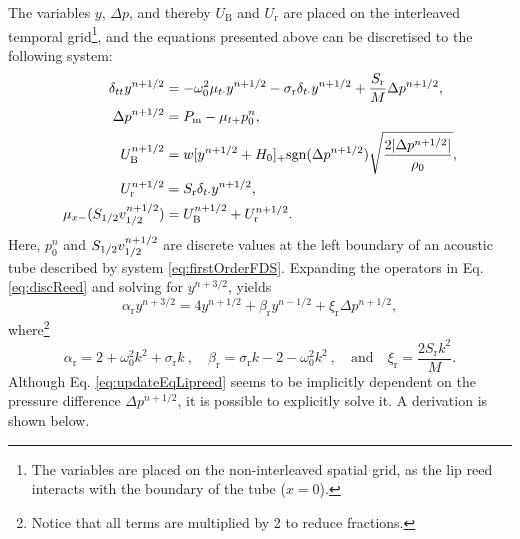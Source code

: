 The variables $y$, $\Delta p$, and thereby $U_\text{B}$ and $U_\text{r}$ are placed on the interleaved temporal grid\footnote{The variables are placed on the non-interleaved spatial grid, as the lip reed interacts with the boundary of the tube ($x=0$).}, and the equations presented above can be discretised to the following system:
\begin{subequations}\label{eq:discreteLipSystem}
    \begin{align}
        \delta_{tt}y^{n+1/2} &= -\omega_0^2\mu_{t\cdot}y^{n+1/2}-\sigma_\text{r}\delta_{t\cdot}y^{n+1/2} + \frac{S_\text{r}}{M}\Delta p^{n+1/2},\label{eq:discReed}\\
        \Delta p^{n+1/2} &= P_\text{m} - \mu_{t+}p_0^n,\label{eq:pDiff}\\
        U_\text{B}^{n+1/2} &= w[y^{n+1/2}+H_0]_+\text{sgn}(\Delta p^{n+1/2})\sqrt{\frac{2|\Delta p^{n+1/2}|}{\rho_0}},\label{eq:bernoulli}\\
        U_\text{r}^{n+1/2} &= S_\text{r}\delta_{t\cdot}y^{n+1/2},\label{eq:Ur}\\
        \mu_{x-}(S_{1/2}v_{1/2}^{n+1/2}) &= U_\text{B}^{n+1/2} + U_\text{r}^{n+1/2}.\label{eq:UbUr}
    \end{align}
\end{subequations}
Here, $p_0^n$ and $S_{1/2}v_{1/2}^{n+1/2}$ are discrete values at the left boundary of an acoustic tube described by system \eqref{eq:firstOrderFDS}. Expanding the operators in Eq. \eqref{eq:discReed} and solving for $y^{n+3/2}$, yields
\begin{equation}\label{eq:updateEqLipreed}
    \alpha_\text{r}y^{n+3/2} = 4y^{n+1/2} + \beta_\text{r}y^{n-1/2} + \xi_\text{r}\Delta p^{n+1/2},
\end{equation}
where\footnote{Notice that all terms are multiplied by 2 to reduce fractions.}
\begin{equation}\label{eq:lipreedUpdateTerms}
    \alpha_\text{r} = 2 + \omega_0^2k^2 + \sigma_\text{r} k\ , \quad \beta_\text{r} =  \sigma_\text{r} k - 2 - \omega_0^2 k^2\ , \quad \text{and} \quad \xi_\text{r} = \frac{2 S_\text{r}k^2}{M}.
\end{equation}
Although Eq. \eqref{eq:updateEqLipreed} seems to be implicitly dependent on the pressure difference $\Delta p^{n+1/2}$, it is possible to explicitly solve it. A derivation is shown below.

